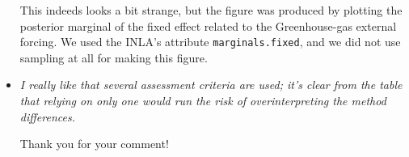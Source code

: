 \documentclass[11pt]{article}
\begin{document}
\begin{itemize}
This indeeds looks a bit strange, but the figure was produced by plotting the posterior marginal of the fixed effect
related to the Greenhouse-gas external forcing. We used the INLA's attribute
\verb|marginals.fixed|, and we did not use sampling at all for making 
this figure.   



\item \textit{I really like that several assessment criteria are used; it's clear
  from the table that relying on only one would run the risk of
  overinterpreting the method differences.}

Thank you for your comment!

\end{itemize}
\end{document}
